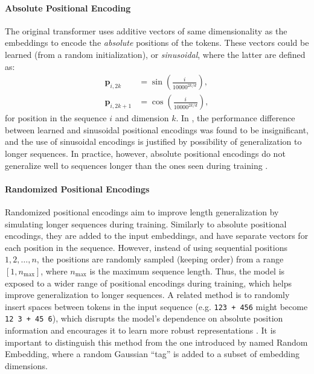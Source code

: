 \paragraph{Absolute Positional Encoding}\label{subsec:absolute_pos_enc}
The original transformer \parencite{vaswani_attention_2017} uses additive vectors of same dimensionality as the embeddings to encode the \emph{absolute} positions of the tokens. These vectors could be learned (from a random initialization), or \emph{sinusoidal}, where the latter are defined as:
\begin{align*}
    \mathbf{p}_{i,2k}   & = \sin\left( \frac{i}{10000^{2k/d}} \right), \\
    \mathbf{p}_{i,2k+1} & = \cos\left( \frac{i}{10000^{2k/d}} \right),
\end{align*}
for position in the sequence $i$ and dimension $k$. In \cite{vaswani_attention_2017}, the performance difference between learned and sinusoidal positional encodings was found to be insignificant, and the use of sinusoidal encodings is justified by possibility of generalization to longer sequences. In practice, however, absolute positional encodings do not generalize well to sequences longer than the ones seen during training \parencite{press_train_2021}.

\paragraph{Randomized Positional Encodings}\label{subsec:random_pos_enc}
Randomized positional encodings \cite{ruoss_randomized_2023} aim to improve length generalization by simulating longer sequences during training. Similarly to absolute positional encodings, they are added to the input embeddings, and have separate vectors for each position in the sequence. However, instead of using sequential positions $1, 2, \dots, n$, the positions are randomly sampled (keeping order) from a range $[1, n_{\text{max}}]$, where $n_{\text{max}}$ is the maximum sequence length. Thus, the model is exposed to a wider range of positional encodings during training, which helps improve generalization to longer sequences. A related method is to randomly insert spaces between tokens in the input sequence (e.g. \texttt{123 + 456} might become \texttt{12 3  + 45 6}), which disrupts the model's dependence on absolute position information and encourages it to learn more robust representations \parencite{shen_positional_2023}. It is important to distinguish this method from the one introduced by \cite{shen_positional_2023} named Random Embedding, where a random Gaussian ``tag'' is added to a subset of embedding dimensions.

